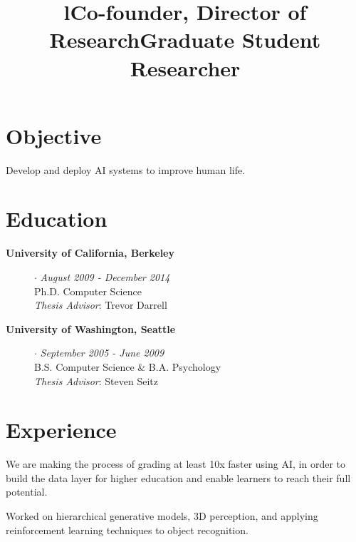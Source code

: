 \documentclass[line, margin]{res}
\title{l}\\
\begin{document}
\newsectionwidth{1in}

\address{\small{\textcolor{MidnightBlue}{http://sergeykarayev.com} $\cdot$ \textcolor{MidnightBlue}{sergeykarayev@gmail.com} $\cdot$ Updated 24 January 2018}}

\begin{resume}
\section{\sc Objective}
Develop and deploy AI systems to improve human life.

\section{\sc Education}
\begin{description}
\item[{\bf University of California, Berkeley}] $\cdot$ {\it August 2009 - December 2014}
\\Ph.D. Computer Science
\\\emph{Thesis Advisor}: Trevor Darrell

\item[{\bf University of Washington, Seattle}] $\cdot$ {\it September 2005 - June 2009}
\\B.S. Computer Science \& B.A. Psychology
\\\emph{Thesis Advisor}: Steven Seitz
\end{description}

\section{\sc Experience}

\title{\bf Co-founder, Director of Research}
\begin{position}
We are making the process of grading at least 10x faster using AI, in order to build the data layer for higher education and enable learners to reach their full potential.
\end{position}

\title{\bf Graduate Student Researcher}
\begin{position}
Worked on hierarchical generative models, 3D perception, and applying reinforcement learning techniques to object recognition.
\end{position}


\end{resume}
\end{document}
